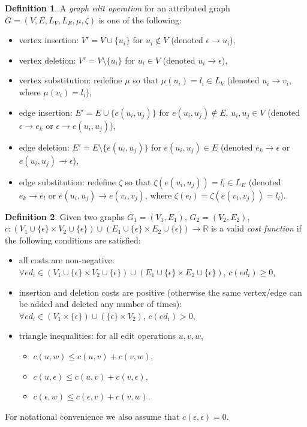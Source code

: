 \documentclass{article}
\theoremstyle{definition}
\newtheorem{definition}{Definition}
\begin{document}
\begin{definition}
  A \emph{graph edit operation} for an attributed graph $G = (V, E, L_V, L_E, \mu, \zeta)$ is one of the following:
  \begin{itemize}
  \item vertex insertion: $V' = V \cup \{ u_i \}$ for $u_i \not \in V$ (denoted $\epsilon \to u_i$),
  \item vertex deletion: $V' = V \setminus \{ u_i \}$ for $u_i \in V$ (denoted $u_i \to \epsilon$),
  \item vertex substitution: redefine $\mu$ so that $\mu(u_i) = l_i \in L_V$ (denoted $u_i \to v_i$, where $\mu(v_i) = l_i$),
  \item edge insertion: $E' = E \cup \{ e(u_i, u_j) \}$ for $e(u_i, u_j) \not \in E$, $u_i, u_j \in V$ (denoted $\epsilon \to e_k$ or $\epsilon \to e(u_i, u_j)$),
  \item edge deletion: $E' = E \setminus \{ e(u_i, u_j) \}$ for $e(u_i, u_j) \in E$ (denoted $e_k \to \epsilon$ or $e(u_i, u_j) \to \epsilon$),
  \item edge substitution: redefine $\zeta$ so that $\zeta(e(u_i, u_j)) = l_l \in L_E$ (denoted $e_k \to e_l$ or $e(u_i, u_j) \to e(v_i, v_j)$, where $\zeta(e_l)=\zeta(e(v_i, v_j))=l_l$).
  \end{itemize}
\end{definition}
\begin{definition}
  \label{def:cost}
  Given two graphs $G_1 = (V_1, E_1)$, $G_2 = (V_2, E_2)$, $c: (V_1 \cup \{ \epsilon \} \times V_2 \cup \{ \epsilon \}) \cup (E_1 \cup \{ \epsilon \} \times E_2 \cup \{ \epsilon \}) \to \mathbb{R}$ is a valid \emph{cost function} if the following conditions are satisfied:
  \begin{itemize}
  \item all costs are non-negative: $\forall ed_i \in (V_1 \cup \{ \epsilon \} \times V_2 \cup \{ \epsilon \}) \cup (E_1 \cup \{ \epsilon \} \times E_2 \cup \{ \epsilon \})$, $c(ed_i) \ge 0$,
  \item insertion and deletion costs are positive (otherwise the same vertex/edge can be added and deleted any number of times): $\forall ed_i \in (V_1 \times \{ \epsilon \}) \cup (\{ \epsilon \} \times V_2)$, $c(ed_i) > 0$,
  \item triangle inequalities: for all edit operations $u, v, w$,
    \begin{itemize}
    \item $c(u, w) \le c(u, v) + c(v, w)$,
    \item $c(u, \epsilon) \le c(u, v) + c(v, \epsilon)$,
    \item $c(\epsilon, w) \le c(\epsilon, v) + c(v, w)$.
    \end{itemize}
  \end{itemize}
  For notational convenience we also assume that $c(\epsilon, \epsilon) = 0$.
\end{definition}
\end{document}
